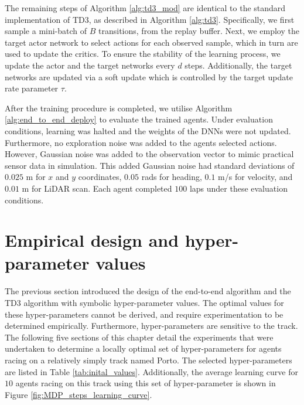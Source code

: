 The remaining steps of Algorithm \ref{alg:td3_mod} are identical to the standard implementation of TD3, as described in Algorithm \ref{alg:td3}. 
Specifically, we first sample a mini-batch of $B$ transitions, from the replay buffer.
Next, we employ the target actor network to select actions for each observed sample, which in turn are used to update the critics. 
To ensure the stability of the learning process, we update the actor and the target networks every $d$ steps. 
Additionally, the target networks are updated via a soft update which is controlled by the target update rate parameter $\tau$. 

After the training procedure is completed, we utilise Algorithm \ref{alg:end_to_end_deploy} to evaluate the trained agents.
Under evaluation conditions, learning was halted and the weights of the DNNs were not updated.
Furthermore, no exploration noise was added to the agents selected actions. 
However, Gaussian noise was added to the observation vector to mimic practical sensor data in simulation. 
This added Gaussian noise had standard deviations of $0.025$ m for $x$ and $y$ coordinates, $0.05$ rads for heading, $0.1$ m/s for velocity, and $0.01$ m for LiDAR scan. 
Each agent completed $100$ laps under these evaluation conditions.







\section{Empirical design and hyper-parameter values}\label{sec:ete_empirical_design}

The previous section introduced the design of the end-to-end algorithm and the TD3 algorithm with symbolic hyper-parameter values. 
The optimal values for these hyper-parameters cannot be derived, and require experimentation to be determined empirically. 
Furthermore, hyper-parameters are sensitive to the track.
The following five sections of this chapter detail the experiments that were undertaken to determine a locally optimal set of hyper-parameters for agents racing on a relatively simply track named Porto.
The selected hyper-parameters are listed in Table \ref{tab:inital_values}.
Additionally, the average learning curve for $10$ agents racing on this track using this set of hyper-parameter is shown in Figure \ref{fig:MDP_steps_learning_curve}.

